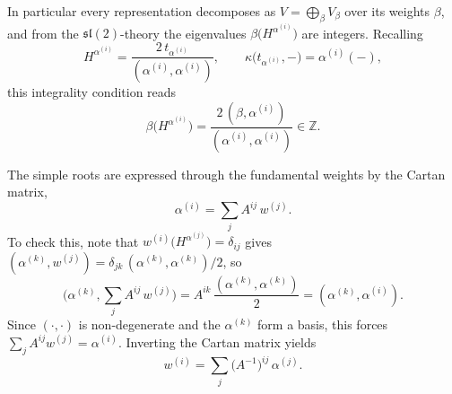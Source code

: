 

In particular every representation decomposes as $V = \bigoplus_\beta V_\beta$ over its weights
$\beta$, and from the $\mathfrak{sl}(2)$-theory the eigenvalues $\beta\big(H^{\alpha^{(i)}}\big)$ are
integers. Recalling
\[
    H^{\alpha^{(i)}} = \frac{2\, t_{\alpha^{(i)}}}{(\alpha^{(i)}, \alpha^{(i)})},
    \qquad
    \kappa\big(t_{\alpha^{(i)}}, -\big) = \alpha^{(i)}(-),
\]
this integrality condition reads
\[
    \beta\big(H^{\alpha^{(i)}}\big) = \frac{2\,(\beta, \alpha^{(i)})}{(\alpha^{(i)}, \alpha^{(i)})}
    \in \mathbb{Z}.
\]



The simple roots are expressed through the fundamental weights by the Cartan matrix,
\[
    \alpha^{(i)} = \sum_j A^{ij}\, w^{(j)}.
\]
To check this, note that $w^{(i)}\big(H^{\alpha^{(j)}}\big) = \delta_{ij}$ gives
$(\alpha^{(k)}, w^{(j)}) = \delta_{jk}\,(\alpha^{(k)}, \alpha^{(k)})/2$, so
\[
    \Big(\alpha^{(k)}, \sum_j A^{ij}\, w^{(j)}\Big)
        = A^{ik}\,\frac{(\alpha^{(k)}, \alpha^{(k)})}{2}
        = (\alpha^{(k)}, \alpha^{(i)}).
\]
Since $(\cdot, \cdot)$ is non-degenerate and the $\alpha^{(k)}$ form a basis, this forces
$\sum_j A^{ij} w^{(j)} = \alpha^{(i)}$. Inverting the Cartan matrix yields
\[
    w^{(i)} = \sum_j \big(A^{-1}\big)^{ij}\, \alpha^{(j)}.
\]

